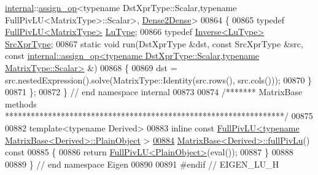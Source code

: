 \begin{DoxyCode}
      \hyperlink{namespaceinternal}{internal}::\hyperlink{struct_eigen_1_1internal_1_1assign__op}{assign\_op}<typename DstXprType::Scalar,typename FullPivLU<MatrixType>::Scalar>, 
      \hyperlink{struct_eigen_1_1internal_1_1_dense2_dense}{Dense2Dense}>
00864 \{
00865   \textcolor{keyword}{typedef} \hyperlink{group___l_u___module_class_eigen_1_1_full_piv_l_u}{FullPivLU<MatrixType>} \hyperlink{group___l_u___module_class_eigen_1_1_full_piv_l_u}{LuType};
00866   \textcolor{keyword}{typedef} \hyperlink{class_eigen_1_1_inverse}{Inverse<LuType>} \hyperlink{class_eigen_1_1_inverse}{SrcXprType};
00867   \textcolor{keyword}{static} \textcolor{keywordtype}{void} run(DstXprType &dst, \textcolor{keyword}{const} SrcXprType &src, \textcolor{keyword}{const} 
      \hyperlink{struct_eigen_1_1internal_1_1assign__op}{internal::assign\_op<typename DstXprType::Scalar,typename MatrixType::Scalar>}
       &)
00868   \{
00869     dst = src.nestedExpression().solve(MatrixType::Identity(src.rows(), src.cols()));
00870   \}
00871 \};
00872 \} \textcolor{comment}{// end namespace internal}
00873 
00874 \textcolor{comment}{/******* MatrixBase methods *****************************************************************/}
00875 
00882 \textcolor{keyword}{template}<\textcolor{keyword}{typename} Derived>
00883 \textcolor{keyword}{inline} \textcolor{keyword}{const} \hyperlink{group___l_u___module_class_eigen_1_1_full_piv_l_u}{FullPivLU<typename MatrixBase<Derived>::PlainObject}
      >
\hyperlink{group___core___module_a25da97d31acab0ee5d9d13bdbb0569da}{00884} \hyperlink{group___core___module_a25da97d31acab0ee5d9d13bdbb0569da}{MatrixBase<Derived>::fullPivLu}()\textcolor{keyword}{ const}
00885 \textcolor{keyword}{}\{
00886   \textcolor{keywordflow}{return} \hyperlink{group___l_u___module_class_eigen_1_1_full_piv_l_u}{FullPivLU<PlainObject>}(eval());
00887 \}
00888 
00889 \} \textcolor{comment}{// end namespace Eigen}
00890 
00891 \textcolor{preprocessor}{#endif // EIGEN\_LU\_H}
\end{DoxyCode}
